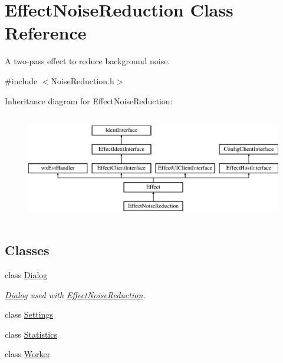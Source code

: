 \hypertarget{class_effect_noise_reduction}{}\section{Effect\+Noise\+Reduction Class Reference}
\label{class_effect_noise_reduction}


A two-\/pass effect to reduce background noise.  




{\ttfamily \#include $<$Noise\+Reduction.\+h$>$}

Inheritance diagram for Effect\+Noise\+Reduction\+:\begin{figure}[H]
\begin{center}
\leavevmode
\includegraphics[height=4.794520cm]{class_effect_noise_reduction}
\end{center}
\end{figure}
\subsection*{Classes}
\begin{DoxyCompactItemize}
\item 
class \hyperlink{class_effect_noise_reduction_1_1_dialog}{Dialog}
\begin{DoxyCompactList}\small\item\em \hyperlink{class_effect_noise_reduction_1_1_dialog}{Dialog} used with \hyperlink{class_effect_noise_reduction}{Effect\+Noise\+Reduction}. \end{DoxyCompactList}\item 
class \hyperlink{class_effect_noise_reduction_1_1_settings}{Settings}
\item 
class \hyperlink{class_effect_noise_reduction_1_1_statistics}{Statistics}
\item 
class \hyperlink{class_effect_noise_reduction_1_1_worker}{Worker}
\end{DoxyCompactItemize}

